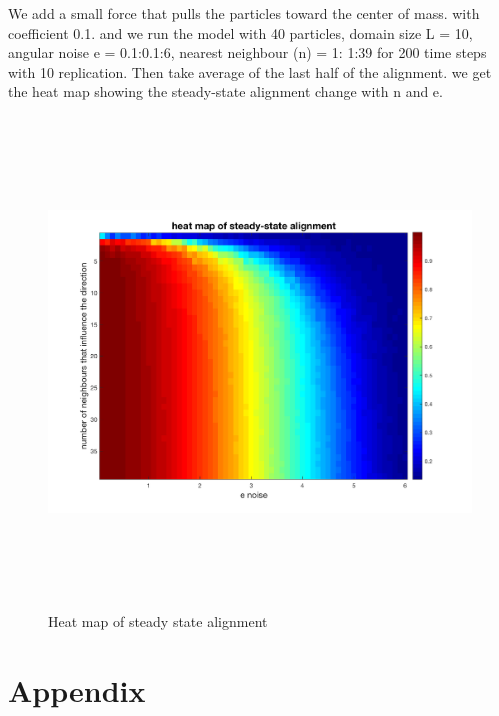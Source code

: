 \documentclass[12pt]{article}
\begin{document}
We add a small force that pulls the particles toward the center of mass. with coefficient 0.1. and we run the model with 40 particles, domain size L = 10, angular noise e = 0.1:0.1:6, nearest neighbour (n) = 1: 1:39 for 200 time steps with 10 replication. Then take average of the last half of the alignment. we get the heat map showing the steady-state alignment change with n and e.
\begin{figure}[H] %
\centering
\includegraphics[width = 16 cm, height = 13cm]{heatmap.png}
\caption{Heat map of steady state alignment}
\label{fig:hm}
\end{figure}




\newpage
\section{Appendix}
\end{document}
